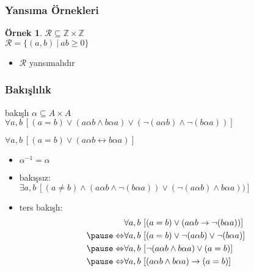 \documentclass[dvipsnames]{beamer}
\theoremstyle{definition}
\theoremstyle{example}
\newtheorem{ornek}[theorem]{Örnek}
\theoremstyle{plain}
\begin{document}
\begin{frame}
  \frametitle{Yansıma Örnekleri}

  \begin{ornek}
    $\mathcal{R} \subseteq \mathbb{Z} \times \mathbb{Z}$\\
    $\mathcal{R} = \{(a,b)~|~ab \geq 0\}$

    \medskip
    \begin{itemize}
      \item $\mathcal{R}$ yansımalıdır
    \end{itemize}
  \end{ornek}
\end{frame}

\begin{frame}
  \frametitle{Bakışlılık}

  \begin{block}{bakışlı}
    $\alpha \subseteq A \times A$\\
    $\forall a,b~[(a=b) \vee (a \alpha b \wedge b \alpha a)
                        \vee (\neg(a \alpha b) \wedge \neg(b \alpha a))]$

    \pause
    $\forall a,b~[(a=b) \vee (a \alpha b \leftrightarrow b \alpha a)]$
  \end{block}

  \pause
  \begin{itemize}
    \item $\alpha^{-1} = \alpha$

    \pause
    \item bakışsız:\\
      $\exists a,b~[(a \neq b) \wedge (a \alpha b \wedge \neg(b \alpha a))
                               \vee (\neg (a \alpha b) \wedge b \alpha a))]$

    \pause
    \item ters bakışlı:
    \vspace{-12pt}
    \begin{eqnarray*}
                      & \forall a,b~
                    [(a=b) \vee (a \alpha b \rightarrow \neg(b \alpha a))]\\\pause
      \Leftrightarrow & \forall a,b~
                    [(a=b) \vee \neg(a \alpha b) \vee \neg(b \alpha a)]\\\pause
      \Leftrightarrow & \forall a,b~
                    [\neg(a \alpha b \wedge b \alpha a) \vee (a=b)]\\\pause
      \Leftrightarrow & \forall a,b~
                    [(a \alpha b \wedge b \alpha a) \rightarrow (a=b)]
    \end{eqnarray*}
  \end{itemize}
\end{frame}
\end{document}

